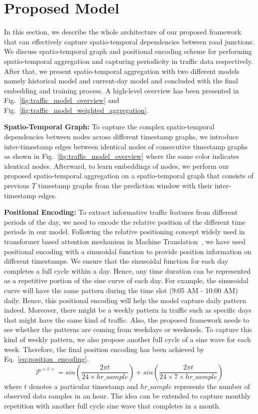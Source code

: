 \documentclass[runningheads]{llncs}
\begin{document}
\section{Proposed Model}

In this section, we describe the whole architecture of our proposed framework that can effectively capture spatio-temporal dependencies between road junctions. We discuss spatio-temporal graph and positional encoding scheme for performing spatio-temporal aggregation and capturing periodicity in traffic data respectively. After that, we present spatio-temporal aggregation with two different models namely historical model and current-day model and concluded with the final embedding and training process.  A high-level overview has been presented in Fig.~\ref{fig:traffic_model_overview} and Fig.~\ref{fig:traffic_model_weighted_aggregation}.

\noindent
\textbf{Spatio-Temporal Graph:} To capture the complex spatio-temporal dependencies between nodes across different timestamp graphs, we introduce inter-timestamp edges between identical nodes of consecutive timestamp graphs as shown in Fig.~\ref{fig:traffic_model_overview} where the same color indicates identical nodes. Afterward, to learn embeddings of nodes, we perform our proposed spatio-temporal aggregation on a spatio-temporal graph that consists of previous $T$ timestamp graphs from the prediction window with their inter-timestamp edges.  

\noindent
\textbf{Positional Encoding:}
To extract informative traffic features from different periods of the day, we need to encode the relative position of the different time periods in our model. Following the relative positioning concept widely used in transformer based attention mechanism in Machine Translation~\cite{vaswani2017attention}, we have used positional encoding with a sinusoidal function to provide position information on different timestamps. We ensure that the sinusoidal function for each day completes a full cycle within a day. Hence, any time duration can be represented as a repetitive portion of the sine curve of each day.  For example, the sinusoidal curve will have the same pattern during the time slot (9:05 AM - 10:00 AM) daily. Hence, this positional encoding will help the model capture daily pattern indeed. Moreover, there might be a weekly pattern in traffic such as specific days that might have the same kind of traffic. Also, the proposed framework needs to see whether the patterns are coming from weekdays or weekends. To capture this kind of weekly pattern, we also propose another full cycle of a sine wave for each week. Therefore, the final position encoding has been achieved by Eq.~\ref{eq:position_encoding}.
\begin{equation}
    \mathcal{P}^{<t>} = sin(\frac{ 2\pi t}{24 \times hr\_sample}) + sin(\frac{2 \pi t}{24\times 7 \times hr\_sample})
    \label{eq:position_encoding}
\end{equation}
where $t$ denotes a particular timestamp and $hr\_sample$ represents the number of observed data samples in an hour. The idea can be extended to capture monthly repetition with another full cycle sine wave that completes in a month. 
\end{document}
